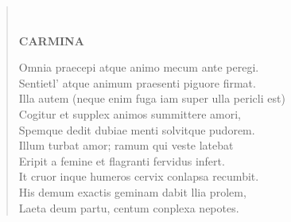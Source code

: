 \documentclass[11pt, a4paper]{report}
\begin{document}
\begin{verse}
        ﻿\pagebreak 
    \begin{center} \textbf{CARMINA} \end{center} \marginpar{[2]} Omnia praecepi atque animo mecum ante peregi. \\ Sentietl’ atque animum praesenti piguore firmat. \\ Illa autem (neque enim fuga iam super ulla pericli est) \\ Cogitur et supplex animos summittere amori, \\ Spemque dedit dubiae menti solvitque pudorem. \\ Illum turbat amor; ramum qui veste latebat \\ Eripit a femine et flagranti fervidus infert. \\ It cruor inque humeros cervix conlapsa recumbit. \\ His demum exactis geminam dabit llia prolem, \\ Laeta deum partu, centum conplexa nepotes. \\ 
      \end{verse}
  
\end{document}
